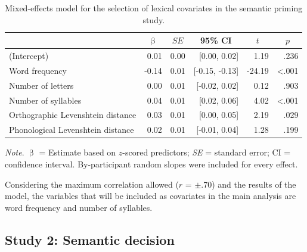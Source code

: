\documentclass[
  12pt,
  man,floatsintext]{apa7}
\begin{document}
\begin{table}[!h]

\caption{\label{tab:semanticpriming-lexical-covariates-selection}Mixed-effects model for the selection of lexical covariates in the semantic priming study.}
\centering
\begin{threeparttable}
\begin{tabular}[t]{lrrrrr}
\toprule
\multicolumn{1}{c}{ } & \multicolumn{1}{c}{$\upbeta$} & \multicolumn{1}{c}{$SE$} & \multicolumn{1}{c}{95\% CI} & \multicolumn{1}{c}{$t$} & \multicolumn{1}{c}{$p$}\\
\midrule
(Intercept) & 0.01 & 0.00 & {}[0.00, 0.02] & 1.19 & .236\\
Word frequency & -0.14 & 0.01 & {}[-0.15, -0.13] & -24.19 & <.001\\
Number of letters & 0.00 & 0.01 & {}[-0.02, 0.02] & 0.12 & .903\\
Number of syllables & 0.04 & 0.01 & {}[0.02, 0.06] & 4.02 & <.001\\
Orthographic Levenshtein distance & 0.03 & 0.01 & {}[0.00, 0.05] & 2.19 & .029\\
Phonological Levenshtein distance & 0.02 & 0.01 & {}[-0.01, 0.04] & 1.28 & .199\\
\bottomrule
\end{tabular}
\begin{tablenotes}
\item \textit{\linebreak} 
\item \textit{Note}. $\upbeta$ = Estimate based on $z$-scored predictors; \textit{SE} = standard error; \linebreak \phantom{.}CI = confidence interval. By-participant random slopes were included for \linebreak \phantom{.}every effect.
\end{tablenotes}
\end{threeparttable}
\end{table}

Considering the maximum correlation allowed (\(r\) = \(\pm\).70) and the results of the model, the variables that will be included as covariates in the main analysis are word frequency and number of syllables.

\hypertarget{study-2-semantic-decision-1}{%
\subsection{Study 2: Semantic decision}\label{study-2-semantic-decision-1}}
\end{document}
